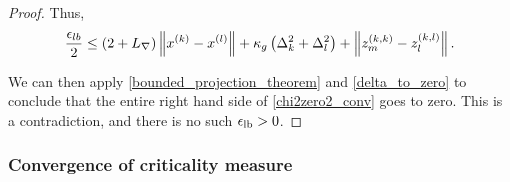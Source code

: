 \begin{proof}



Thus,
\begin{align}
\frac{\epsilon_{lb}} 2 \le \left(2 + {L_{\nabla}}\right) \left\|x^{(k)} - {x^{(l)}}\right\| 
+ \kappa_g \left(\Delta_k^2 + \Delta_l^2\right)
+ \left\|{z_m^{(k, k)}} - {z_l^{(k, l)}}\right\|.
\label{chi2zero2_conv}
\end{align}

We can then apply \cref{bounded_projection_theorem} and \cref{delta_to_zero} to conclude that the entire right hand side of \cref{chi2zero2_conv} goes to zero.
This is a contradiction, and there is no such ${\epsilon_{\textrm{lb}}} > 0$.
\end{proof}

\subsubsection{Convergence of criticality measure}
\label{limit_of_true_criticality}


